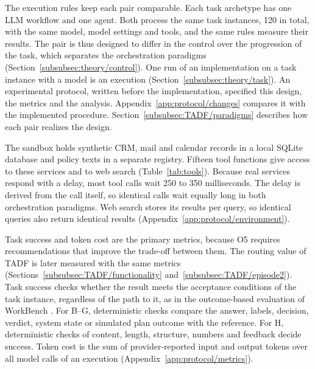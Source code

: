The execution rules keep each pair comparable. Each task archetype has one LLM workflow and one agent. Both process the same task instances, 120 in total, with the same model, model settings and tools, and the same rules measure their results. The pair is thus designed to differ in the control over the progression of the task, which separates the orchestration paradigms (Section~\ref{subsubsec:theory/control}). One run of an implementation on a task instance with a model is an execution (Section~\ref{subsubsec:theory/task}). An experimental protocol, written before the implementation, specified this design, the metrics and the analysis. Appendix~\ref{app:protocol/changes} compares it with the implemented procedure. Section~\ref{subsubsec:TADF/paradigms} describes how each pair realizes the design.

The sandbox holds synthetic CRM, mail and calendar records in a local SQLite database and policy texts in a separate registry. Fifteen tool functions give access to these services and to web search (Table~\ref{tab:tools}). Because real services respond with a delay, most tool calls wait 250 to 350 milliseconds. The delay is derived from the call itself, so identical calls wait equally long in both orchestration paradigms. Web search stores its results per query, so identical queries also return identical results (Appendix~\ref{app:protocol/environment}).

Task success and token cost are the primary metrics, because O5 requires recommendations that improve the trade-off between them. The routing value of TADF is later measured with the same metrics (Sections~\ref{subsubsec:TADF/functionality} and~\ref{subsubsec:TADF/episode2}). Task success checks whether the result meets the acceptance conditions of the task instance, regardless of the path to it, as in the outcome-based evaluation of WorkBench \parencite{stylesWorkBenchBenchmarkDataset2024}. For B--G, deterministic checks compare the answer, labels, decision, verdict, system state or simulated plan outcome with the reference. For H, deterministic checks of content, length, structure, numbers and feedback decide success. Token cost is the sum of provider-reported input and output tokens over all model calls of an execution (Appendix~\ref{app:protocol/metrics}).

